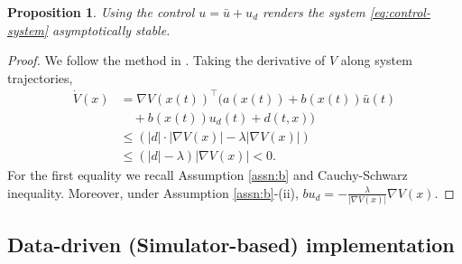 \documentclass[letterpaper, 10 pt, conference]{ieeeconf}  %
\newtheorem{proposition}{Proposition}
\newcommand{\tp}{^\top}
\newcommand{\grad}{\nabla}
\begin{document}

\begin{proposition}
Using the control $u = \bar{u} + u_d$ renders the system \eqref{eq:control-system} asymptotically stable. 
\end{proposition}
\begin{proof}
We follow the method in \cite[Chapter 14.2]{khalil}. 
Taking the derivative of $V$ along system trajectories, 
\begin{align*}
\dot{V}(x) &= \grad V (x(t)) \tp \bigg( a(x(t)) + b(x(t))\bar{u}(t) \\ & \quad + b(x(t))u_d(t) + d(t,x) \bigg) \\
& \le  (| d | \cdot | \grad V(x)| -\lambda |\grad V (x)|) \\
& \le (|d| - \lambda ) |\grad V (x)| < 0.
\end{align*}
For the first equality we recall Assumption \ref{assn:b} and Cauchy-Schwarz inequality. 
Moreover, under Assumption \ref{assn:b}-(ii), $bu_d = - \frac{\lambda}{| \grad V(x)|} \grad V(x)$.
\end{proof}


\subsection{Data-driven (Simulator-based) implementation}
\end{document}
